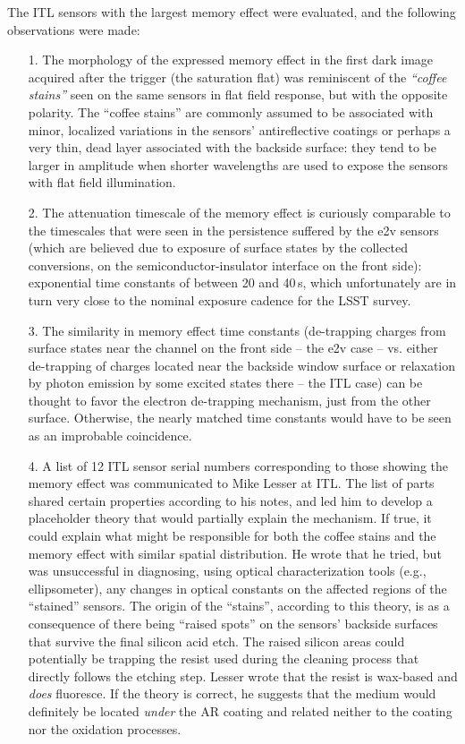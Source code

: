 The ITL sensors with the largest memory effect were evaluated, and the following observations were made:
\begin{itemize}
    \item[1.] The morphology of the expressed memory effect in the first dark image acquired after the trigger (the saturation flat) was reminiscent of the {\it ``coffee stains''} seen on the same sensors in flat field response, but with the opposite polarity. The ``coffee stains'' are commonly assumed to be associated with minor, localized variations in the sensors' antireflective coatings or perhaps a very thin, dead layer associated with the backside surface: they tend to be larger in amplitude when shorter wavelengths are used to expose the sensors with flat field illumination.
    \item[2.] The attenuation timescale of the memory effect is curiously comparable to the timescales that were seen in the persistence suffered by the e2v sensors (which are believed due to exposure of surface states by the collected conversions, on the semiconductor-insulator interface on the front side): exponential time constants of between 20 and 40\,s, which unfortunately are in turn very close to the nominal exposure cadence for the LSST survey.
    \item[3.] The similarity in memory effect time constants (de-trapping charges from surface states near the channel on the front side -- the e2v case -- vs. either de-trapping of charges located near the backside window surface or relaxation by photon emission by some excited states there -- the ITL case) can be thought to favor the electron de-trapping mechanism, just from the other surface. Otherwise, the nearly matched time constants would have to be seen as an improbable coincidence.
    \item[4.] A list of 12 ITL sensor serial numbers corresponding to those showing the memory effect was communicated to Mike Lesser at ITL. The list of parts shared certain properties according to his notes, and led him to develop a placeholder theory that would partially explain the mechanism. If true, it could explain what might be responsible for both the coffee stains and the memory effect with similar spatial distribution. He wrote that he tried, but was unsuccessful in diagnosing, using optical characterization tools (e.g., ellipsometer), any changes in optical constants on the affected regions of the ``stained'' sensors. The origin of the ``stains'', according to this theory, is as a consequence of there being ``raised spots'' on the sensors' backside surfaces that survive the final silicon acid etch. The raised silicon areas could potentially be trapping the resist used during the cleaning process that directly follows the etching step. Lesser wrote that the resist is wax-based and {\it does} fluoresce. If the theory is correct, he suggests that the medium would definitely be located {\it under} the AR coating and related neither to the coating nor the oxidation processes.

\end{itemize}
